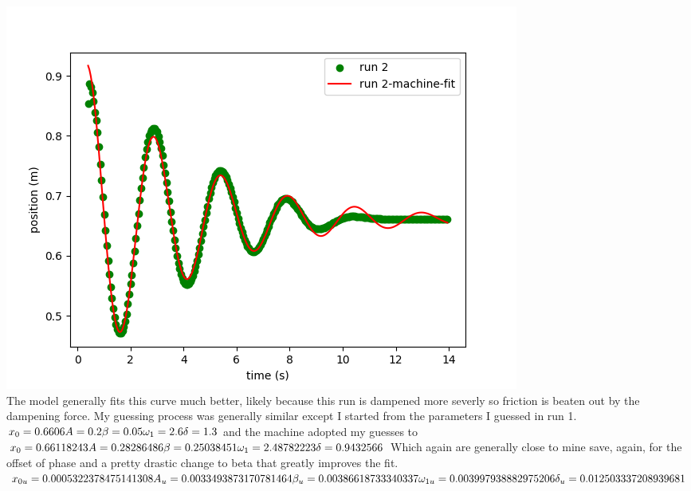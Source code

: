 \documentclass[10pt]{article}
\theoremstyle{definition}
\begin{document}
\includegraphics{Figure_1.png}\\
The model generally fits this curve much better, likely because this run is dampened more severly so friction is beaten out by the
dampening force. My guessing process was generally similar except I started from the parameters I guessed in run 1. \\
$
x_0 = 0.6606 \\
A = 0.2 \\
\beta = 0.05 \\
\omega_1 = 2.6 \\
\delta = 1.3 \\
$
and the machine adopted my guesses to \\
$
x_0 = 0.66118243 \\
A = 0.28286486 \\
\beta = 0.25038451 \\
\omega_1 = 2.48782223 \\
\delta = 0.9432566 \\
$
Which again are generally close to mine save, again, for the offset of phase and a pretty drastic change to beta that greatly improves the fit.\\
$
x_{0u} = 0.0005322378475141308 \\
A_u = 0.0033493873170781464 \\
\beta_u = 0.00386618733340337 \\
\omega_{1u} = 0.003997938882975206 \\
\delta_u = 0.012503337208939681 \\
$
\end{document}
